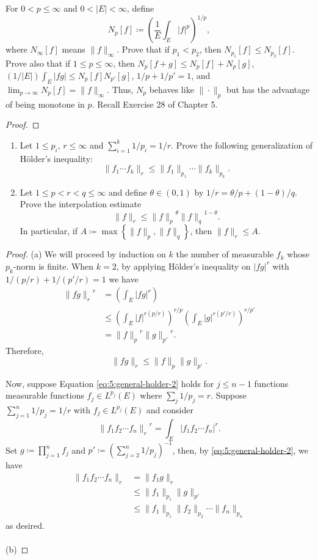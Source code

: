 \begin{problem}
For $0<p\leq\infty$ and $0<|E|<\infty$, define
\[
N_p[f]\coloneqq\left(\frac{1}{E}\int_E|f|^p\right)^{1/p},
\]
where $N_\infty[f]$ means $\|f\|_\infty$. Prove that if $p_1<p_2$, then
$N_{p_1}[f]\leq N_{p_2}[f]$. Prove also that if $1\leq p\leq \infty$, then
$N_p[f+g]\leq N_p[f]+N_p[g]$, $(1/|E|)\int_E|fg|\leq N_p[f]N_{p'}[g]$,
$1/p+1/p'=1$, and $\lim_{p\to\infty} N_p[f]=\|f\|_\infty$. Thus, $N_p$
behaves like $\|\cdot\|_p$ but has the advantage of being monotone in
$p$. Recall Exercise 28 of Chapter 5.
\end{problem}
\begin{proof}
\end{proof}
\newpage

\begin{problem}
\begin{enumerate}[label=(\alph*)]
\item Let $1\leq p_i$, $r\leq\infty$ and $\sum_{i=1}^k1/p_i=1/r$. Prove the
  following generalization of Hölder's inequality:
\[
\|f_1\dotsm f_k\|_r\leq\|f_1\|_{p_1}\dotsm\|f_k\|_{p_k}.
\]
\item Let $1\leq p<r<q\leq\infty$ and define $\theta\in(0,1)$ by
  $1/r=\theta/p+(1-\theta)/q$. Prove the interpolation estimate
\[
\|f\|_r\leq{\|f\|_p}^\theta{\|f\|_q}^{1-\theta}.
\]
In particular, if $A\coloneqq\max\left\{\|f\|_p,\|f\|_q\right\}$, then
$\|f\|_r\leq A$.
\end{enumerate}
\end{problem}
\begin{proof}
(a) We will proceed by induction on $k$ the number of measurable $f_k$
whose $p_k$-norm is finite. When $k=2$, by applying Hölder's inequality on
$|fg|^r$ with $1/(p/r)+1/(p'/r)=1$ we have
\begin{align*}
{\|fg\|_r}^r
&=\left(\int_E|fg|^r\right)\\
&\leq\left(\int_E|f|^{r(p/r)}\right)^{r/p}\left(\int_E|g|^{r(p'/r)}\right)^{r/p'}\\
&={\|f\|_p}^r{\|g\|_{p'}}^r.
\end{align*}
Therefore,
\begin{equation}
  \label{eq:5:general-holder-2}
{\|fg\|_r}\leq\|f\|_p\|g\|_{p'}.
\end{equation}

Now, suppose Equation \eqref{eq:5:general-holder-2} holds for $j\leq n-1$
functions measurable functions $f_j\in L^{p_j}(E)$ where
$\sum_j1/p_j=r$. Suppose $\sum_{j=1}^n1/p_j=1/r$ with $f_j\in L^{p_j}(E)$
and consider
\[
{\|f_1f_2\dotsm f_n\|_r}^r=\int_E|f_1f_2\dotsm
f_n|^r.
\]
Set $g\coloneqq\prod_{j=1}^n f_j$ and
$p'\coloneqq\left(\sum_{j=2}^n1/p_j\right)^{-1}$, then, by
\eqref{eq:5:general-holder-2}, we have
\begin{align*}
\|f_1f_2\dotsm f_n\|_r
&=\|f_1g\|_r\\
&\leq\|f_1\|_{p_1}\|g\|_{p'}\\
&\leq\|f_1\|_{p_1}\|f_2\|_{p_2}\dotsm\|f_n\|_{p_n}
\end{align*}
as desired.
\\\\
(b)
\end{proof}
\newpage

